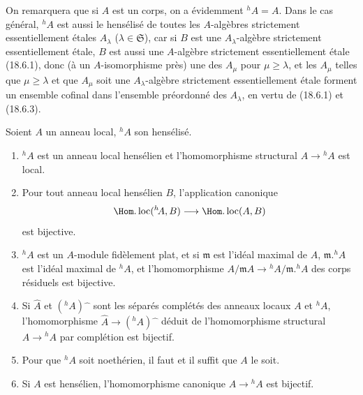On remarquera que si $A$ est un corps, on a évidemment ${}^h\!A=A$. Dans le cas général, ${}^h\!A$ est aussi le hensélisé de toutes les $A$-algèbres strictement essentiellement étales $A_\lambda$ ($\lambda\in\mathfrak S$), car si $B$ est une $A_\lambda$-algèbre strictement essentiellement étale, $B$ est aussi une $A$-algèbre strictement essentiellement étale (18.6.1), donc (à un $A$-isomorphisme près) une des $A_\mu$ pour $\mu\geq\lambda$, et les $A_\mu$ telles que $\mu\geq\lambda$ et que $A_\mu$ soit une $A_\lambda$-algèbre strictement essentiellement étale forment un ensemble cofinal dans l'ensemble préordonné des $A_\lambda$, en vertu de (18.6.1) et (18.6.3).

\begin{theorem}[18.6.6]
\label{IV.18.6.6}
Soient $A$ un anneau local, ${}^h\!A$ son hensélisé.
\begin{enumerate}
  \item[(i)] ${}^h\!A$ est un anneau local hensélien et l'homomorphisme structural $A\to{}^h\!A$ est local.
  \item[(ii)] Pour tout anneau local hensélien $B$, l'application canonique
  \[
    \Hom.\operatorname{loc}({}^h\!A,B)\longrightarrow\Hom.\operatorname{loc}(A,B)
  \]
  est bijective.
  \item[(iii)] ${}^h\!A$ est un $A$-module fidèlement plat, et si $\mathfrak m$ est l'idéal maximal de $A$, $\mathfrak m.{}^h\!A$ est l'idéal maximal de ${}^h\!A$, et l'homomorphisme $A/\mathfrak mA\to{}^h\!A/\mathfrak m.{}^h\!A$ des corps résiduels est bijective.
  \item[(iv)] Si $\widehat A$ et $({}^h\!A)\widehat{\phantom{x}}$ sont les séparés complétés des anneaux locaux $A$ et ${}^h\!A$, l'homomorphisme $\widehat A\to({}^h\!A)\widehat{\phantom{x}}$ déduit de l'homomorphisme structural $A\to{}^h\!A$ par complétion est bijectif.
  \item[(v)] Pour que ${}^h\!A$ soit noethérien, il faut et il suffit que $A$ le soit.
  \item[(vi)] Si $A$ est hensélien, l'homomorphisme canonique $A\to{}^h\!A$ est bijectif.
\end{enumerate}
\end{theorem}

